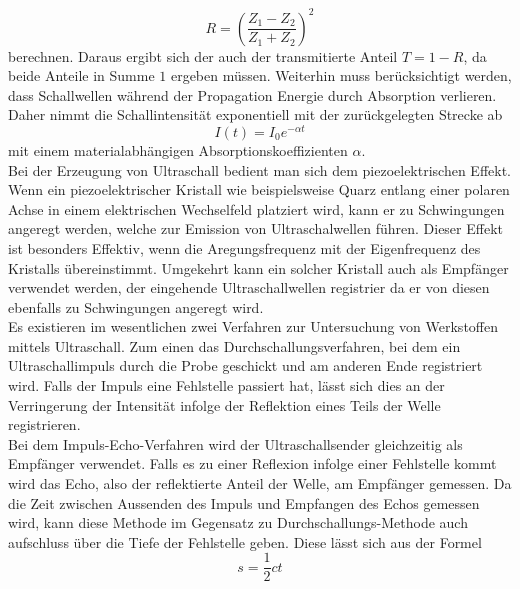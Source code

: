 \begin{equation}
R=(\frac{Z_1-Z_2}{Z_1+Z_2})^2
\end{equation}
berechnen. Daraus ergibt sich der auch der transmitierte Anteil $T=1-R$, da beide Anteile in Summe $1$ ergeben müssen.
Weiterhin muss berücksichtigt werden, dass Schallwellen während der Propagation Energie durch Absorption verlieren. Daher nimmt die Schallintensität exponentiell mit der zurückgelegten Strecke ab
\begin{equation}
I(t)=I_0e^{-\alpha t}
\end{equation}
mit einem materialabhängigen Absorptionskoeffizienten $\alpha$. \\
Bei der Erzeugung von Ultraschall bedient man sich dem piezoelektrischen Effekt. Wenn ein piezoelektrischer Kristall wie beispielsweise Quarz entlang einer polaren Achse in einem elektrischen Wechselfeld platziert wird, kann er zu Schwingungen angeregt werden, welche zur Emission von Ultraschalwellen führen. Dieser Effekt ist besonders Effektiv, wenn die Aregungsfrequenz mit der Eigenfrequenz des Kristalls übereinstimmt. Umgekehrt kann ein solcher Kristall auch als Empfänger verwendet werden, der eingehende Ultraschallwellen registrier da er von diesen ebenfalls zu Schwingungen angeregt wird. \\
Es existieren im wesentlichen zwei Verfahren zur Untersuchung von Werkstoffen mittels Ultraschall. Zum einen das Durchschallungsverfahren, bei dem ein Ultraschallimpuls durch die Probe geschickt und am anderen Ende registriert wird. Falls der Impuls eine Fehlstelle passiert hat, lässt sich dies an der Verringerung der Intensität infolge der Reflektion eines Teils der Welle registrieren. \\
Bei dem Impuls-Echo-Verfahren wird der Ultraschallsender gleichzeitig als Empfänger verwendet. Falls es zu einer Reflexion infolge einer Fehlstelle kommt wird das Echo, also der reflektierte Anteil der Welle, am Empfänger gemessen. Da die Zeit zwischen Aussenden des Impuls und Empfangen des Echos gemessen wird, kann diese Methode im Gegensatz zu Durchschallungs-Methode auch aufschluss über die Tiefe der Fehlstelle geben. Diese lässt sich aus der Formel
\begin{equation}
s=\frac{1}{2}ct
\end{equation}
